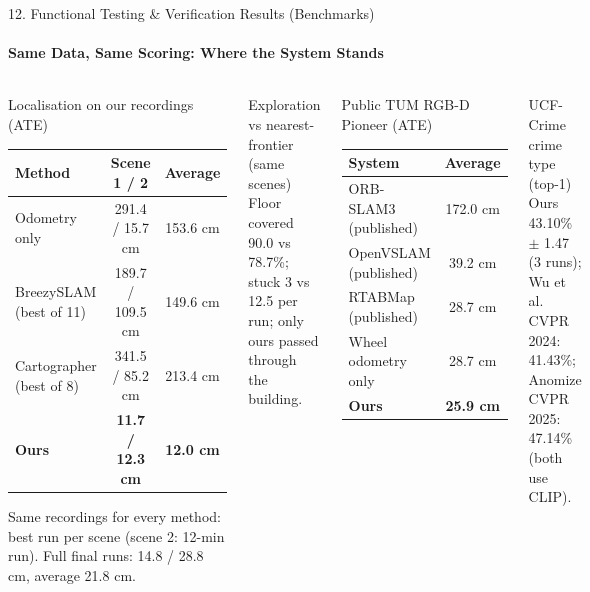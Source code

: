 \documentclass[aspectratio=169, 11pt]{beamer}
\begin{document}
\begin{frame}{12. Functional Testing \& Verification Results (Benchmarks)}
    \framesubtitle{Same Data, Same Scoring: Where the System Stands}
    \begin{columns}[T]
        \begin{block}{Localisation on our recordings (ATE)}
            \scriptsize
            \begin{tabular}{lcc}
                \toprule
                \textbf{Method} & \textbf{Scene 1 / 2} & \textbf{Average} \\
                \midrule
                Odometry only & 291.4 / 15.7 cm & 153.6 cm \\
                BreezySLAM (best of 11) & 189.7 / 109.5 cm & 149.6 cm \\
                Cartographer (best of 8) & 341.5 / 85.2 cm & 213.4 cm \\
                \textbf{Ours} & \textbf{11.7 / 12.3 cm} & \textbf{12.0 cm} \\
                \bottomrule
            \end{tabular}

            {\tiny Same recordings for every method: best run per scene (scene 2: 12-min run). Full final runs: 14.8 / 28.8 cm, average 21.8 cm.}
        \end{block}
        \begin{block}{Exploration vs nearest-frontier (same scenes)}
            \scriptsize
            Floor covered 90.0 vs 78.7\%; stuck 3 vs 12.5 per run; only ours passed through the building.
        \end{block}

        \begin{block}{Public TUM RGB-D Pioneer (ATE)}
            \scriptsize
            \begin{tabular}{lc}
                \toprule
                \textbf{System} & \textbf{Average} \\
                \midrule
                ORB-SLAM3 (published) & 172.0 cm \\
                OpenVSLAM (published) & 39.2 cm \\
                RTABMap (published) & 28.7 cm \\
                Wheel odometry only & 28.7 cm \\
                \textbf{Ours} & \textbf{25.9 cm} \\
                \bottomrule
            \end{tabular}
        \end{block}
        \begin{block}{UCF-Crime crime type (top-1)}
            \scriptsize
            Ours 43.10\% $\pm$ 1.47 (3 runs); Wu et al. CVPR 2024: 41.43\%; Anomize CVPR 2025: 47.14\% (both use CLIP).
        \end{block}
    \end{columns}
\end{frame}
\end{document}
